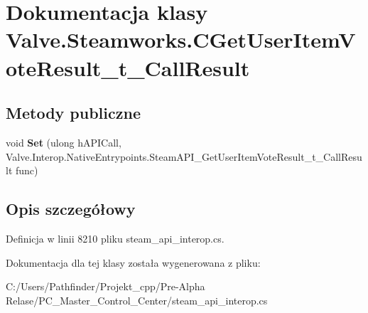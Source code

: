 \hypertarget{class_valve_1_1_steamworks_1_1_c_get_user_item_vote_result__t___call_result}{}\section{Dokumentacja klasy Valve.\+Steamworks.\+C\+Get\+User\+Item\+Vote\+Result\+\_\+t\+\_\+\+Call\+Result}
\label{class_valve_1_1_steamworks_1_1_c_get_user_item_vote_result__t___call_result}
\subsection*{Metody publiczne}
\begin{DoxyCompactItemize}
\item 
\mbox{\label{class_valve_1_1_steamworks_1_1_c_get_user_item_vote_result__t___call_result_a2cee47ccd4d644f2c4722cff9e6516f6}} 
void {\bfseries Set} (ulong h\+A\+P\+I\+Call, Valve.\+Interop.\+Native\+Entrypoints.\+Steam\+A\+P\+I\+\_\+\+Get\+User\+Item\+Vote\+Result\+\_\+t\+\_\+\+Call\+Result func)
\end{DoxyCompactItemize}


\subsection{Opis szczegółowy}


Definicja w linii 8210 pliku steam\+\_\+api\+\_\+interop.\+cs.



Dokumentacja dla tej klasy została wygenerowana z pliku\+:\begin{DoxyCompactItemize}
\item 
C\+:/\+Users/\+Pathfinder/\+Projekt\+\_\+cpp/\+Pre-\/\+Alpha Relase/\+P\+C\+\_\+\+Master\+\_\+\+Control\+\_\+\+Center/steam\+\_\+api\+\_\+interop.\+cs\end{DoxyCompactItemize}
